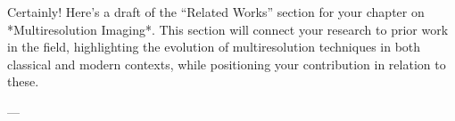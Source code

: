 


Certainly! Here’s a draft of the “Related Works” section for your chapter on *Multiresolution Imaging*. This section will connect your research to prior work in the field, highlighting the evolution of multiresolution techniques in both classical and modern contexts, while positioning your contribution in relation to these.

---




